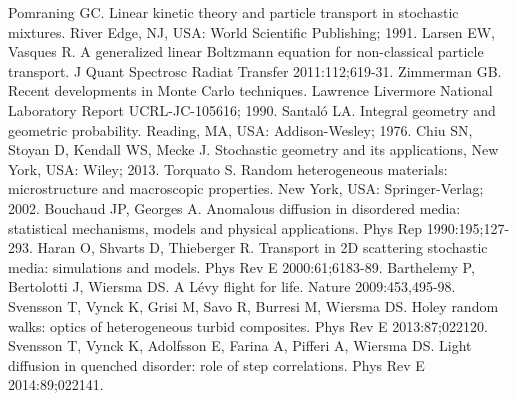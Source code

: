 \documentclass[final,authoryear,5p,times,twocolumn]{elsarticle}
\begin{document}
\begin{thebibliography}{10}


 Pomraning GC. Linear kinetic theory and particle transport in stochastic mixtures. River Edge, NJ, USA: World Scientific Publishing; 1991.
 Larsen EW, Vasques R. A generalized linear Boltzmann equation for non-classical particle transport. J Quant Spectrosc Radiat Transfer 2011:112;619-31.
 Zimmerman GB. Recent developments in Monte Carlo techniques. Lawrence Livermore National Laboratory Report UCRL-JC-105616; 1990.
 Santal\'{o} LA. Integral geometry and geometric probability. Reading, MA, USA: Addison-Wesley; 1976.
 Chiu SN, Stoyan D, Kendall WS, Mecke J. Stochastic geometry and its applications, New York, USA: Wiley; 2013.
 Torquato S. Random heterogeneous materials: microstructure and macroscopic properties. New York, USA: Springer-Verlag; 2002.
 Bouchaud JP, Georges A. Anomalous diffusion in disordered media: statistical mechanisms, models and physical applications. Phys Rep 1990:195;127-293.
 Haran O, Shvarts D, Thieberger R. Transport in 2D scattering stochastic media: simulations and models. Phys Rev E 2000:61;6183-89.
 Barthelemy P, Bertolotti J, Wiersma DS. A L\'evy flight for life. Nature 2009:453,495-98.
 Svensson T, Vynck K, Grisi M, Savo R, Burresi M, Wiersma DS. Holey random walks: optics of heterogeneous turbid composites. Phys Rev E 2013:87;022120.
 Svensson T, Vynck K, Adolfsson E, Farina A, Pifferi A, Wiersma DS. Light diffusion in quenched disorder: role of step correlations. Phys Rev E 2014:89;022141.

\end{thebibliography}
\end{document}
